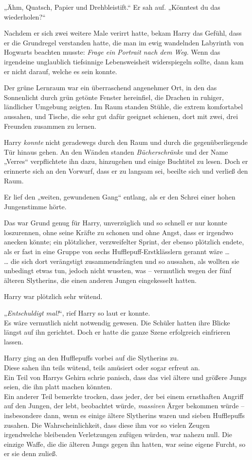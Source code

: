 {„Ähm, Quatsch, Papier und Drehbleistift.“ Er sah auf. „Könntest du das wiederholen?“

Nachdem er sich zwei weitere Male verirrt hatte, bekam Harry das Gefühl, dass er die Grundregel verstanden hatte, die man im ewig wandelnden Labyrinth von Hogwarts beachten musste: \emph{Frage ein Portrait nach dem Weg.} Wenn das irgendeine unglaublich tiefsinnige Lebensweisheit widerspiegeln sollte, dann kam er nicht darauf, welche es sein konnte.

Der grüne Lernraum war ein überraschend angenehmer Ort, in den das Sonnenlicht durch grün getönte Fenster hereinfiel, die Drachen in ruhiger, ländlicher Umgebung zeigten. Im Raum standen Stühle, die extrem komfortabel aussahen, und Tische, die sehr gut dafür geeignet schienen, dort mit zwei, drei Freunden zusammen zu lernen.

Harry \emph{konnte} nicht geradewegs durch den Raum und durch die gegenüberliegende Tür hinaus gehen. An den Wänden standen \emph{Bücherschränke} und der Name „Verres“ verpflichtete ihn dazu, hinzugehen und einige Buchtitel zu lesen. Doch er erinnerte sich an den Vorwurf, dass er zu langsam sei, beeilte sich und verließ den Raum.

Er lief den „weiten, gewundenen Gang“ entlang, als er den Schrei einer hohen Jungenstimme hörte.

Das war Grund genug für Harry, unverzüglich und so schnell er nur konnte loszurennen, ohne seine Kräfte zu schonen und ohne Angst, dass er irgendwo anecken könnte; ein plötzlicher, verzweifelter Sprint, der ebenso plötzlich endete, als er fast in eine Gruppe von sechs Hufflepuff-Erstklässlern gerannt wäre …\\ … die sich dort verängstigt zusammendrängten und so aussahen, als wollten sie unbedingt etwas tun, jedoch nicht wussten, was -- vermutlich wegen der fünf älteren Slytherins, die einen anderen Jungen eingekesselt hatten.

Harry war plötzlich sehr wütend.

„\emph{Entschuldigt mal!}“, rief Harry so laut er konnte.\\ Es wäre vermutlich nicht notwendig gewesen. Die Schüler hatten ihre Blicke längst auf ihn gerichtet. Doch er hatte die ganze Szene erfolgreich einfrieren lassen.

Harry ging an den Hufflepuffs vorbei auf die Slytherins zu.\\ Diese sahen ihn teils wütend, teils amüsiert oder sogar erfreut an.\\ Ein Teil von Harrys Gehirn schrie panisch, dass das viel ältere und größere Jungs seien, die ihn platt machen könnten.\\ Ein anderer Teil bemerkte trocken, dass jeder, der bei einem ernsthaften Angriff auf den Jungen, der lebt, beobachtet würde, \emph{massiven} Ärger bekommen würde -- insbesondere dann, wenn es einige ältere Slytherins waren und sieben Hufflepuffs zusahen. Die Wahrscheinlichkeit, dass diese ihm vor so vielen Zeugen irgendwelche bleibenden Verletzungen zufügen würden, war nahezu null. Die einzige Waffe, die die älteren Jungs gegen ihn hatten, war seine eigene Furcht, so er sie denn zuließ.

}
